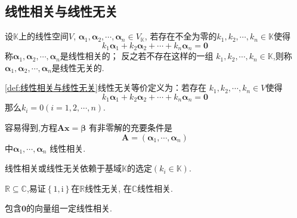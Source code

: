 \subsection{线性相关与线性无关}
\begin{formal}
\begin{definition}[线性相关与线性无关]\label{def:线性相关与线性无关}
    设$\mathbb{K}$上的线性空间$V$,
    $\bm{\alpha}_1,\bm{\alpha}_2,\cdots,
    \bm{\alpha}_n \in 
    V_{\mathbb{K}}$,
    若存在不全为零的$k_1,k_2,\cdots,k_n \in 
    \mathbb{K}$使得\[
    k_1\bm{\alpha}_1+k_2\bm{\alpha}_2+\cdots
    +k_n\bm{\alpha}_n = \bm{0}
    \]
    称$\bm{\alpha}_1,\bm{\alpha}_2,\cdots,
    \bm{\alpha}_n $是线性相关的；
    反之若不存在这样的一组
    $k_1,k_2,\cdots,k_n\in\mathbb{K}$,则称
    $\bm{\alpha}_1,\bm{\alpha}_2,\cdots,
    \bm{\alpha}_n $是线性无关的.
\end{definition}\end{formal}
\begin{formal}
\begin{definition}[线性无关的等价定义]\label{def:线性无关的等价定义}
    \cref{def:线性相关与线性无关}线性无关等价定义为：若存在
    $k_1,k_2,\cdots,k_n\in V$使得
    \[
    k_1\bm{\alpha}_1 +k_2\bm{\alpha}_2+\cdots +
    k_n\bm{\alpha}_n = \bm{0}
    \]
    那么$k_i = 0\left(i = 1,2,\cdots,n
    \right).$
\end{definition}\end{formal}
\begin{red}
\begin{remark}
    容易得到,方程$\bm{A}\bm{x} = \bm{\beta}$
有非零解的充要条件是
\[
\bm{A} = \left(\bm{\alpha}_1,\cdots
,\bm{\alpha}_n\right)
\]
中$\bm{\alpha}_1,\cdots,\bm{\alpha}_n$
线性相关.
\end{remark}
\end{red}
\begin{formal}
\begin{theorem}[线性关系的非唯一性]\label{thm:线性关系的非唯一性}
    线性相关或线性无关依赖于基域$\mathbb{K}
    $的选定$\left(k_i \in \mathbb{K}
    \right)$.
\end{theorem}
\end{formal}
\begin{brown}
\begin{example}
    $\mathbb{R} \subseteq
    \mathbb{C}$,易证$\left\{1,\mathrm{i}
    \right\}$在$\mathbb{R}$线性无关,
    在$\mathbb{C}$线性相关.
\end{example}\end{brown}
\begin{green}
\begin{corollary}[含有零向量的向量组]\label{cor:含有零向量的向量组}
    包含$\bm{0}$的向量组一定线性相关.
\end{corollary}
\end{green}
